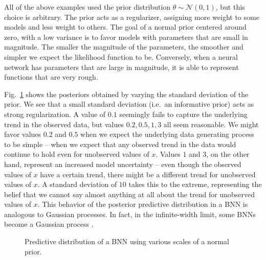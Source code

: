 \documentclass[12pt]{article}
\begin{document}
All of the above examples used the prior distribution $\theta \sim \mathcal{N}(0, 1)$, but this choice is arbitrary. The prior acts as a regularizer, assigning more weight to some models and less weight to others. The goal of a normal prior centered around zero, with a low variance is to favor models with parameters that are small in magnitude. The smaller the magnitude of the parameters, the smoother and simpler we expect the likelihood function to be. Conversely, when a neural network has parameters that are large in magnitude, it is able to represent functions that are very rough.

Fig.\ \ref{fig_1d_predictions_by_stdev} shows the posteriors obtained by varying the standard deviation of the prior. We see that a small standard deviation (i.e.\ an informative prior) acts as strong regularization. A value of $0.1$ seemingly fails to capture the underlying trend in the observed data, but values $0.2, 0.5, 1, 3$ all seem reasonable. We might favor values $0.2$ and $0.5$ when we expect the underlying data generating process to be simple -- when we expect that any observed trend in the data would continue to hold even for unobserved values of $x$. Values $1$ and $3$, on the other hand, represent an increased model uncertainty -- even though the observed values of $x$ have a certain trend, there might be a different trend for unobserved values of $x$. A standard deviation of $10$ takes this to the extreme, representing the belief that we cannot say almost anything at all about the trend for unobserved values of $x$. This behavior of the posterior predictive distribution in a BNN is analogous to Gaussian processes. In fact, in the infinite-width limit, some BNNs become a Gaussian process \cite{neural_tangents}.

\begin{figure}[H]
\centering
{}
\caption{Predictive distribution of a BNN using various scales of a normal prior.}
\label{fig_1d_predictions_by_stdev}
\end{figure}
\end{document}
